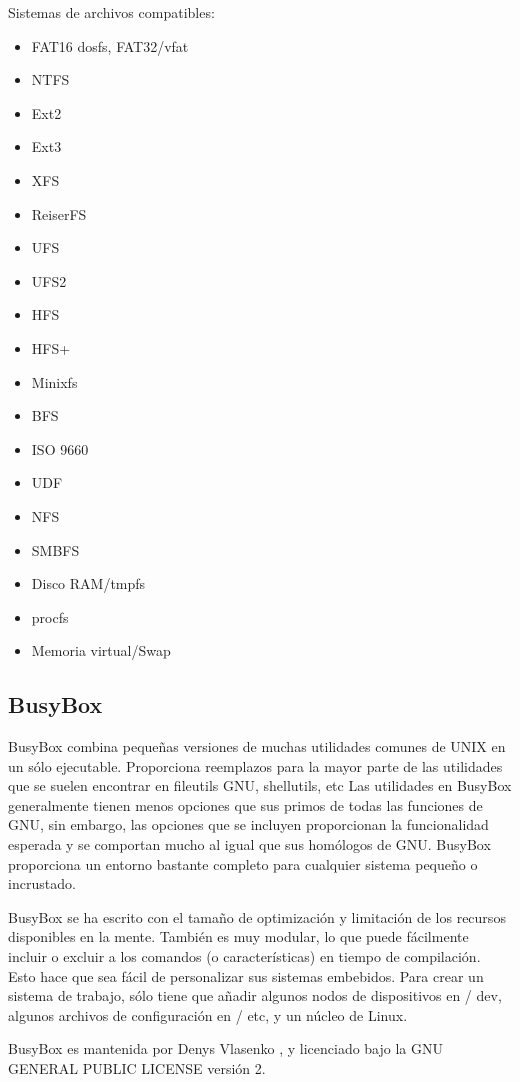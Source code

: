 Sistemas de archivos compatibles:


			\begin{itemize}
				\item FAT16 dosfs, FAT32/vfat	
				\item NTFS	
				\item Ext2	
				\item Ext3	
				\item XFS	
				\item ReiserFS	
				\item UFS	
				\item UFS2	
				\item HFS
				\item HFS+	
				\item Minixfs	
				\item BFS	
				\item ISO 9660	 
				\item UDF	
				\item NFS	
				\item SMBFS	
				\item Disco RAM/tmpfs	
				\item procfs	
				\item Memoria virtual/Swap	
				
			\end{itemize}


 	
			\subsection{BusyBox}	
			 
BusyBox combina pequeñas versiones de muchas utilidades comunes de UNIX en un sólo ejecutable. Proporciona reemplazos para la mayor parte de las utilidades que se suelen encontrar en fileutils GNU, shellutils, etc Las utilidades en BusyBox generalmente tienen menos opciones que sus primos de todas las funciones de GNU, sin embargo, las opciones que se incluyen proporcionan la funcionalidad esperada y se comportan mucho al igual que sus homólogos de GNU. BusyBox proporciona un entorno bastante completo para cualquier sistema pequeño o incrustado.

BusyBox se ha escrito con el tamaño de optimización y limitación de los recursos disponibles en la mente. También es muy modular, lo que puede fácilmente incluir o excluir a los comandos (o características) en tiempo de compilación. Esto hace que sea fácil de personalizar sus sistemas embebidos. Para crear un sistema de trabajo, sólo tiene que añadir algunos nodos de dispositivos en / dev, algunos archivos de configuración en / etc, y un núcleo de Linux.

BusyBox es mantenida por Denys Vlasenko , y licenciado bajo la GNU GENERAL PUBLIC LICENSE versión 2.


			
 			
 